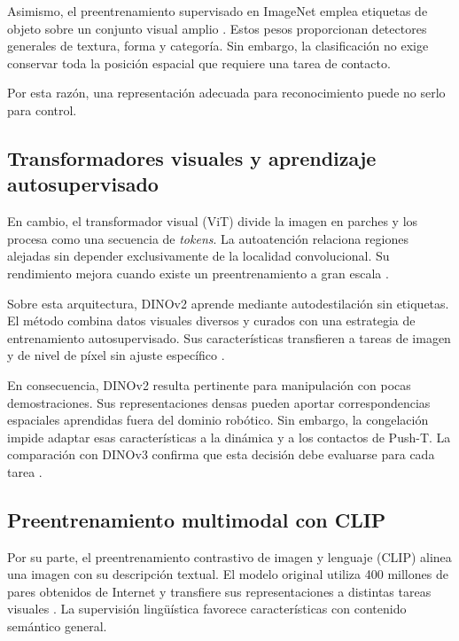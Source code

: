 Asimismo, el preentrenamiento supervisado en ImageNet emplea etiquetas de objeto
sobre un conjunto visual amplio \cite{deng2009imagenet}. Estos pesos proporcionan
detectores generales de textura, forma y categor\'ia. Sin embargo, la clasificaci\'on
no exige conservar toda la posici\'on espacial que requiere una tarea de contacto.

Por esta raz\'on, una representaci\'on adecuada para reconocimiento puede no serlo
para control.

\subsection{Transformadores visuales y aprendizaje autosupervisado}
\label{subsec:vit-dinov2}

En cambio, el transformador visual (ViT) divide la imagen en parches y los procesa
como una secuencia de \textit{tokens}. La autoatenci\'on relaciona regiones alejadas
sin depender exclusivamente de la localidad convolucional. Su rendimiento mejora
cuando existe un preentrenamiento a gran escala \cite{dosovitskiy2021vit}.

Sobre esta arquitectura, DINOv2 aprende mediante autodestilaci\'on sin etiquetas. El
m\'etodo combina datos visuales diversos y curados con una estrategia de
entrenamiento autosupervisado. Sus caracter\'isticas transfieren a tareas de imagen y
de nivel de p\'ixel sin ajuste espec\'ifico \cite{oquab2024dinov2}.

En consecuencia, DINOv2 resulta pertinente para manipulaci\'on con pocas
demostraciones. Sus representaciones densas pueden aportar correspondencias
espaciales aprendidas fuera del dominio rob\'otico. Sin embargo, la congelaci\'on
impide adaptar esas caracter\'isticas a la din\'amica y a los contactos de Push-T. La
comparaci\'on con DINOv3 confirma que esta decisi\'on debe evaluarse para cada tarea
\cite{egbe2025dinov3dp}.

\subsection{Preentrenamiento multimodal con CLIP}
\label{subsec:clip}

Por su parte, el preentrenamiento contrastivo de imagen y lenguaje (CLIP) alinea una
imagen con su descripci\'on textual. El modelo original utiliza 400 millones de pares
obtenidos de Internet y transfiere sus representaciones a distintas tareas visuales
\cite{radford2021clip}. La supervisi\'on ling\"u\'istica favorece caracter\'isticas con
contenido sem\'antico general.

